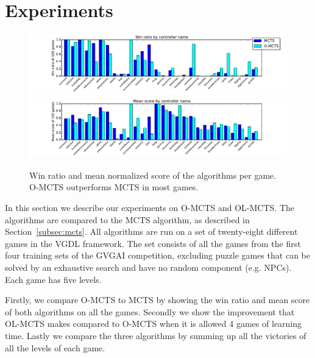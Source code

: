 \section{Experiments}
\label{sec:experiments}
\begin{figure}
\centering
\includegraphics[width=\textwidth]{includes/wins}
\centering
\includegraphics[width=\textwidth]{includes/scores}
\vspace{-.8cm}
\caption{Win ratio and mean normalized score of the algorithms per game. O-MCTS
outperforms MCTS in most games.}
\label{fig:scores}
\end{figure}

In this section we describe our experiments on O-MCTS and OL-MCTS\@. The
algorithms are compared to the MCTS algorithm, as described in
Section~\ref{subsec:mcts}. All algorithms are run on a set of twenty-eight
different games in the VGDL framework. The set consists of all the games from
the first four training sets of the GVGAI competition, excluding puzzle games
that can be solved by an exhaustive search and have no random component (e.g.
NPCs). Each game has five levels.

Firstly, we compare O-MCTS to MCTS by showing the win ratio and mean score of
both algorithms on all the games. Secondly we show the improvement that OL-MCTS
makes compared to O-MCTS when it is allowed 4 games of learning time. 
Lastly we compare the three algorithms by summing up all the victories of all
the levels of each game.  

